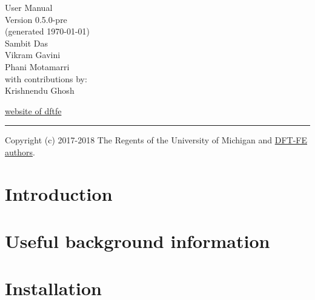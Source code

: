 \documentclass{article}
\begin{document}
{%
\color{dark_grey}
\vspace{1.0em}
\hfill{\Huge \fontfamily{\sfdefault}\selectfont User Manual \\
\raggedleft \huge \fontfamily{\sfdefault}\selectfont Version
0.5.0-pre %
\\\large(generated \today)\\
\vspace{1.5em}
{\Large Sambit Das\,\\Vikram Gavini\,\\Phani Motamarri\\}
\vspace{1.0em}
\large
\noindent with contributions by: \\
    {\Large Krishnendu Ghosh\\}
\vspace{1.0em}
}
\null
\vspace{17em}

{\noindent
{\fontfamily{\sfdefault}\selectfont \href{https://sites.google.com/umich.edu/dftfe}{website of dftfe}}
}


{\noindent
\color{dark_grey}
\rule{\textwidth}{2pt}
}

}
Copyright (c) 2017-2018 The Regents of the University of Michigan and \hyperref[sec:authors]{DFT-FE authors}.
\pagebreak
{}


\pagebreak

\tableofcontents

\pagebreak

\section{Introduction}
\label{sec:intro}


\section{Useful background information}
\label{sec:background}


\section{Installation}
\label{sec:installation}

\end{document}
